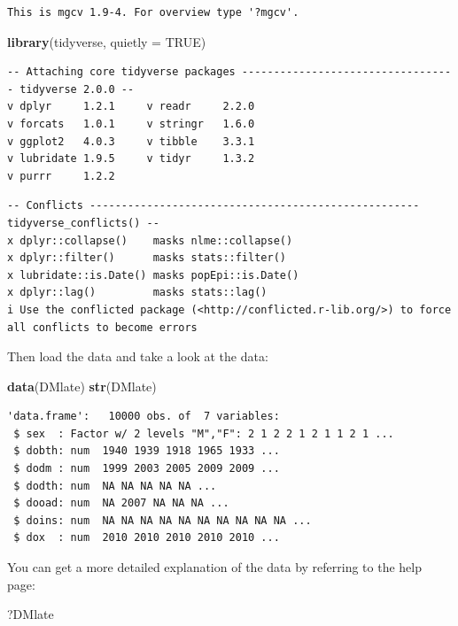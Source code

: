\documentclass[
]{book}
\newenvironment{Shaded}{\begin{snugshade}}{\end{snugshade}}
\newcommand{\AttributeTok}[1]{\textcolor[rgb]{0.13,0.29,0.53}{#1}}
\newcommand{\ConstantTok}[1]{\textcolor[rgb]{0.56,0.35,0.01}{#1}}
\newcommand{\FunctionTok}[1]{\textcolor[rgb]{0.13,0.29,0.53}{\textbf{#1}}}
\newcommand{\NormalTok}[1]{#1}
\theoremstyle{definition}
\theoremstyle{definition}
\theoremstyle{definition}
\theoremstyle{definition}
\theoremstyle{remark}
\begin{document}
\begin{verbatim}
This is mgcv 1.9-4. For overview type '?mgcv'.
\end{verbatim}

\begin{Shaded}
\begin{Highlighting}[]
\FunctionTok{library}\NormalTok{(tidyverse, }\AttributeTok{quietly =} \ConstantTok{TRUE}\NormalTok{)}
\end{Highlighting}
\end{Shaded}

\begin{verbatim}
-- Attaching core tidyverse packages ---------------------------------- tidyverse 2.0.0 --
v dplyr     1.2.1     v readr     2.2.0
v forcats   1.0.1     v stringr   1.6.0
v ggplot2   4.0.3     v tibble    3.3.1
v lubridate 1.9.5     v tidyr     1.3.2
v purrr     1.2.2     
\end{verbatim}

\begin{verbatim}
-- Conflicts ---------------------------------------------------- tidyverse_conflicts() --
x dplyr::collapse()    masks nlme::collapse()
x dplyr::filter()      masks stats::filter()
x lubridate::is.Date() masks popEpi::is.Date()
x dplyr::lag()         masks stats::lag()
i Use the conflicted package (<http://conflicted.r-lib.org/>) to force all conflicts to become errors
\end{verbatim}

Then load the data and take a look at the data:

\begin{Shaded}
\begin{Highlighting}[]
\FunctionTok{data}\NormalTok{(DMlate)}
\FunctionTok{str}\NormalTok{(DMlate)}
\end{Highlighting}
\end{Shaded}

\begin{verbatim}
'data.frame':   10000 obs. of  7 variables:
 $ sex  : Factor w/ 2 levels "M","F": 2 1 2 2 1 2 1 1 2 1 ...
 $ dobth: num  1940 1939 1918 1965 1933 ...
 $ dodm : num  1999 2003 2005 2009 2009 ...
 $ dodth: num  NA NA NA NA NA ...
 $ dooad: num  NA 2007 NA NA NA ...
 $ doins: num  NA NA NA NA NA NA NA NA NA NA ...
 $ dox  : num  2010 2010 2010 2010 2010 ...
\end{verbatim}

You can get a more detailed explanation of the data by referring to
the help page:

\begin{Shaded}
\begin{Highlighting}[]
\NormalTok{?DMlate}
\end{Highlighting}
\end{Shaded}
\end{document}
